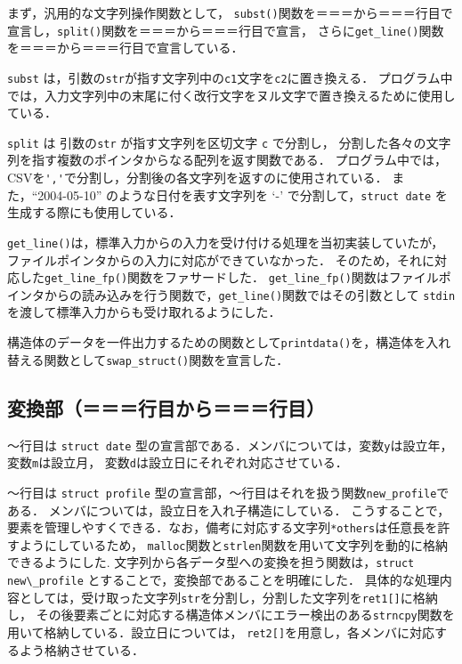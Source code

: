 \documentclass[a4j,11pt]{jarticle}
\begin{document}
まず，汎用的な文字列操作関数として，
\verb|subst()|関数を＝＝＝から＝＝＝行目で宣言し，\verb|split()|関数を＝＝＝から＝＝＝行目で宣言，
さらに\verb|get_line()|関数を＝＝＝から＝＝＝行目で宣言している．

\verb|subst| は，引数の\verb|str|が指す文字列中の\verb|c1|文字を\verb|c2|に置き換える．
プログラム中では，入力文字列中の末尾に付く改行文字をヌル文字で置き換えるために使用している．

\verb|split| は 引数の\verb|str| が指す文字列を区切文字 \verb|c| で分割し，
分割した各々の文字列を指す複数のポインタからなる配列を返す関数である．
プログラム中では，CSVを\verb|','|で分割し，分割後の各文字列を返すのに使用されている．
また，``2004-05-10'' のような日付を表す文字列を `-' で分割して，\verb|struct date| を生成する際にも使用している．

\verb|get_line()|は，標準入力からの入力を受け付ける処理を当初実装していたが，ファイルポインタからの入力に対応ができていなかった．
そのため，それに対応した\verb|get_line_fp()|関数をファサードした．
\verb|get_line_fp()|関数はファイルポインタからの読み込みを行う関数で，\verb|get_line()|関数ではその引数として
\verb|stdin|を渡して標準入力からも受け取れるようにした．

構造体のデータを一件出力するための関数として\verb|printdata()|を，構造体を入れ替える関数として\verb|swap_struct()|関数を宣言した．
\subsection{変換部（＝＝＝行目から＝＝＝行目）}

〜行目は \verb|struct date| 型の宣言部である．メンバについては，変数\verb|y|は設立年，変数\verb|m|は設立月，
変数\verb|d|は設立日にそれぞれ対応させている．

〜行目は \verb|struct profile| 型の宣言部，〜行目はそれを扱う関数\verb|new_profile|である．
メンバについては，設立日を入れ子構造にしている．
こうすることで，要素を管理しやすくできる．なお，備考に対応する文字列\verb|*others|は任意長を許すようにしているため，
\verb|malloc|関数と\verb|strlen|関数を用いて文字列を動的に格納できるようにした. 
文字列から各データ型への変換を担う関数は，\verb|struct new\_profile| とすることで，変換部であることを明確にした．
具体的な処理内容としては，受け取った文字列\verb|str|を分割し，分割した文字列を\verb|ret1[]|に格納し，
その後要素ごとに対応する構造体メンバにエラー検出のある\verb|strncpy|関数を用いて格納している．設立日については，
\verb|ret2[]|を用意し，各メンバに対応するよう格納させている．
\end{document}
